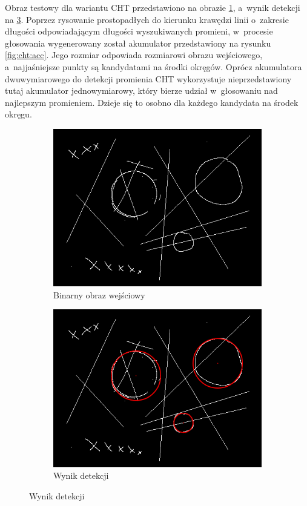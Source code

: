 Obraz testowy dla wariantu CHT przedstawiono na obrazie \ref{fig:cht:input}, a~wynik detekcji na \ref{fig:cht:output}. Poprzez rysowanie prostopadłych do kierunku krawędzi linii o~zakresie długości odpowiadającym długości wyszukiwanych promieni, w~procesie głosowania wygenerowany został akumulator przedstawiony na rysunku \ref{fig:cht:acc}. Jego rozmiar odpowiada rozmiarowi obrazu wejściowego, a~najjaśniejsze punkty są kandydatami na środki okręgów. Oprócz akumulatora dwuwymiarowego do detekcji promienia CHT wykorzystuje nieprzedstawiony tutaj akumulator jednowymiarowy, który bierze udział w~głosowaniu nad najlepszym promieniem. Dzieje się to osobno dla każdego kandydata na środek okręgu.

\begin{figure}
    \centering
    \begin{subfigure}{.475\linewidth}
          \includegraphics[width=\textwidth]{img/cht/input.png}
          \caption{Binarny obraz wejściowy}\label{fig:cht:input}
    \end{subfigure}%
    \hfill
    \begin{subfigure}{.475\linewidth}
      \includegraphics[width=\textwidth]{img/cht/output.png}
      \caption{Wynik detekcji}\label{fig:cht:output}
    \end{subfigure}%
    \bigskip
    

\end{figure}
